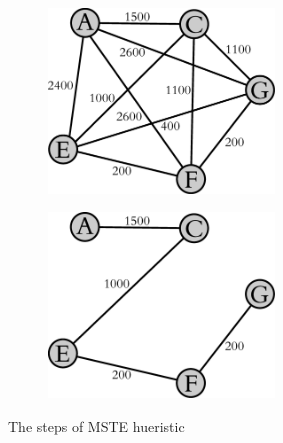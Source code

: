 \documentclass[10pt,letterpaper]{article}
\begin{document}
\begin{figure}[htbp]
\centering
\begin{subfigure}{0.49\textwidth}
\includegraphics[width=60mm]{steiner_1}
\end{subfigure}
\begin{subfigure}{0.49\textwidth}
\includegraphics[width=60mm]{steiner_2}
\end{subfigure}
\caption{
The steps of MSTE hueristic
}
\label{fig:steiner}
\end{figure}
\end{document}
